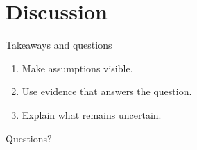 \documentclass[aspectratio=169]{beamer}
\begin{document}
\section{Discussion}
\begin{frame}{Takeaways and questions}
\begin{enumerate}\item Make assumptions visible.\item Use evidence that answers the question.\item Explain what remains uncertain.\end{enumerate}
\vfill\centering Questions?
\end{frame}
\end{document}
